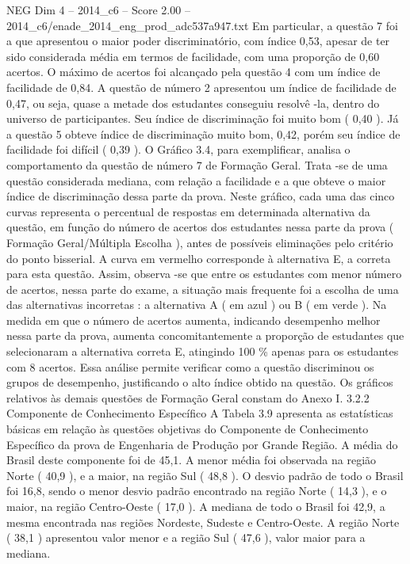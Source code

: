 \begin{textsample}{NEG Dim 4 – 2014\_c6 – Score 2.00 – 2014\_c6/enade\_2014\_eng\_prod\_adc537a947.txt}
Em particular, a questão 7 foi a que apresentou o maior poder discriminatório, com índice 0,53, apesar de ter sido considerada média em termos de facilidade, com uma proporção de 0,60 acertos.
O máximo de acertos foi alcançado pela questão 4 com um índice de facilidade de 0,84.
A questão de número 2 apresentou um índice de facilidade de 0,47, ou seja, quase a metade dos estudantes conseguiu resolvê -la, dentro do universo de participantes.
Seu índice de discriminação foi muito bom ( 0,40 ).
Já a questão 5 obteve índice de discriminação muito bom, 0,42, porém seu índice de facilidade foi difícil ( 0,39 ).
O Gráfico 3.4, para exemplificar, analisa o comportamento da questão de número 7 de Formação Geral.
Trata -se de uma questão considerada mediana, com relação a facilidade e a que obteve o maior índice de discriminação dessa parte da prova.
Neste gráfico, cada uma das cinco curvas representa o percentual de respostas em determinada alternativa da questão, em função do número de acertos dos estudantes nessa parte da prova ( Formação Geral/Múltipla Escolha ), antes de possíveis eliminações pelo critério do ponto bisserial.
A curva em vermelho corresponde à alternativa E, a correta para esta questão.
Assim, observa -se que entre os estudantes com menor número de acertos, nessa parte do exame, a situação mais frequente foi a escolha de uma das alternativas incorretas : a alternativa A ( em azul ) ou B ( em verde ).
Na medida em que o número de acertos aumenta, indicando desempenho melhor nessa parte da prova, aumenta concomitantemente a proporção de estudantes que selecionaram a alternativa correta E, atingindo 100 \% apenas para os estudantes com 8 acertos.
Essa análise permite verificar como a questão discriminou os grupos de desempenho, justificando o alto índice obtido na questão.
Os gráficos relativos às demais questões de Formação Geral constam do Anexo I. 3.2.2 Componente de Conhecimento Específico A Tabela 3.9 apresenta as estatísticas básicas em relação às questões objetivas do Componente de Conhecimento Específico da prova de Engenharia de Produção por Grande Região.
A média do Brasil deste componente foi de 45,1.
A menor média foi observada na região Norte ( 40,9 ), e a maior, na região Sul ( 48,8 ).
O desvio padrão de todo o Brasil foi 16,8, sendo o menor desvio padrão encontrado na região Norte ( 14,3 ), e o maior, na região Centro-Oeste ( 17,0 ).
A mediana de todo o Brasil foi 42,9, a mesma encontrada nas regiões Nordeste, Sudeste e Centro-Oeste.
A região Norte ( 38,1 ) apresentou valor menor e a região Sul ( 47,6 ), valor maior para a mediana.

\end{textsample}
